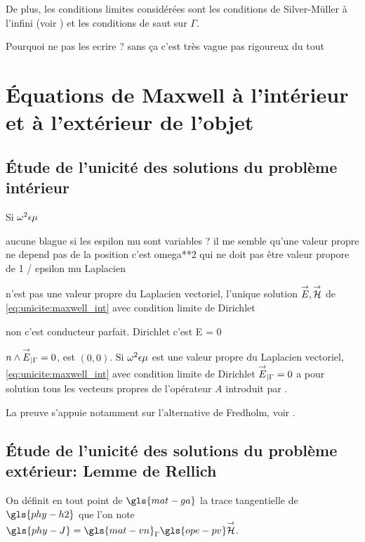 De plus, les conditions limites considérées sont les conditions de Silver-Müller à l'infini (voir \cite[eq (5.2.24), p.~183]{nedelec_acoustic_2001}) et les conditions de saut sur \(\Gamma\).
\begin{REM}
  Pourquoi ne pas les ecrire ? sans ça c'est très vague pas rigoureux du tout
\end{REM}

\section{Équations de Maxwell à l'intérieur et à l'extérieur de l'objet}

  \subsection{Étude de l'unicité des solutions du problème intérieur}

    \begin{thm}
      Si \(\omega^2\epsilon\mu\)
      \begin{REM}
  aucune blague si les espilon mu sont variables ? il me semble qu'une valeur propre ne depend pas de la position c'est omega**2 qui ne doit pas être valeur propore de 1 / epsilon mu Laplacien  
\end{REM}
 n'est pas une valeur propre du Laplacien vectoriel, l'unique solution \({\overset{\rightarrow}{E}},{\overset{\rightarrow}{\mathcal{H}}}\) de \eqref{eq:unicite:maxwell_int} avec condition limite de Dirichlet 
 \begin{REM}
  non c'est conducteur parfait. Dirichlet c'est E = 0
\end{REM}\(n\wedge {\overset{\rightarrow}{E}}_{|\Gamma} = 0\),  est \((0,0)\).
      Si \(\omega^2\epsilon\mu\) est une valeur propre du Laplacien vectoriel, \eqref{eq:unicite:maxwell_int} avec condition limite de Dirichlet \({\overset{\rightarrow}{E}}_{|\Gamma} = 0\) a pour solution tous les vecteurs propres de l'opérateur \(A\) introduit par \cite[eq.~(133), p.~58]{cessenat_mathematical_1996}.
    \end{thm}
    La preuve s'appuie notamment sur l'alternative de Fredholm, voir \cite[Théorème~8, p.~111]{cessenat_mathematical_1996}.

  \subsection{Étude de l'unicité des solutions du problème extérieur: Lemme de Rellich}

    On définit en tout point de \(\gls{mat-ga}\) la trace tangentielle de \(\gls{phy-h2}\) que l'on note \(\gls{phy-J} = \gls{mat-vn}_\Gamma \gls{ope-pv} \vH\).

